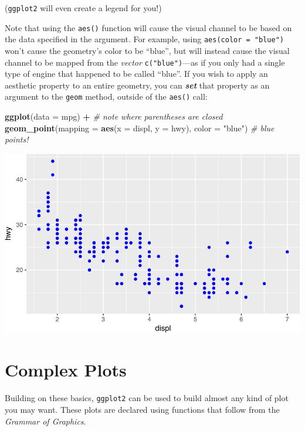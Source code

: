 \documentclass[]{book}
\newenvironment{Shaded}{\begin{snugshade}}{\end{snugshade}}
\newcommand{\KeywordTok}[1]{\textcolor[rgb]{0.13,0.29,0.53}{\textbf{#1}}}
\newcommand{\DataTypeTok}[1]{\textcolor[rgb]{0.13,0.29,0.53}{#1}}
\newcommand{\StringTok}[1]{\textcolor[rgb]{0.31,0.60,0.02}{#1}}
\newcommand{\CommentTok}[1]{\textcolor[rgb]{0.56,0.35,0.01}{\textit{#1}}}
\newcommand{\OperatorTok}[1]{\textcolor[rgb]{0.81,0.36,0.00}{\textbf{#1}}}
\newcommand{\NormalTok}[1]{#1}
\theoremstyle{definition}
\theoremstyle{definition}
\theoremstyle{remark}
\begin{document}
(\texttt{ggplot2} will even create a legend for you!)

Note that using the \texttt{aes()} function will cause the visual
channel to be based on the data specified in the argument. For example,
using \texttt{aes(color\ =\ "blue")} won't cause the geometry's color to
be ``blue'', but will instead cause the visual channel to be mapped from
the \emph{vector} \texttt{c("blue")}---as if you only had a single type
of engine that happened to be called ``blue''. If you wish to apply an
aesthetic property to an entire geometry, you can \textbf{\emph{set}}
that property as an argument to the \texttt{geom} method, outside of the
\texttt{aes()} call:

\begin{Shaded}
\begin{Highlighting}[]
\KeywordTok{ggplot}\NormalTok{(}\DataTypeTok{data =}\NormalTok{ mpg) }\OperatorTok{+}\StringTok{                         }\CommentTok{# note where parentheses are closed}
\StringTok{  }\KeywordTok{geom_point}\NormalTok{(}\DataTypeTok{mapping =} \KeywordTok{aes}\NormalTok{(}\DataTypeTok{x =}\NormalTok{ displ, }\DataTypeTok{y =}\NormalTok{ hwy), }\DataTypeTok{color =} \StringTok{"blue"}\NormalTok{)  }\CommentTok{# blue points!}
\end{Highlighting}
\end{Shaded}

\includegraphics{img/ggplot2/color_blue-1.pdf}

\section{Complex Plots}\label{complex-plots}

Building on these basics, \texttt{ggplot2} can be used to build almost
any kind of plot you may want. These plots are declared using functions
that follow from the \emph{Grammar of Graphics}.
\end{document}
